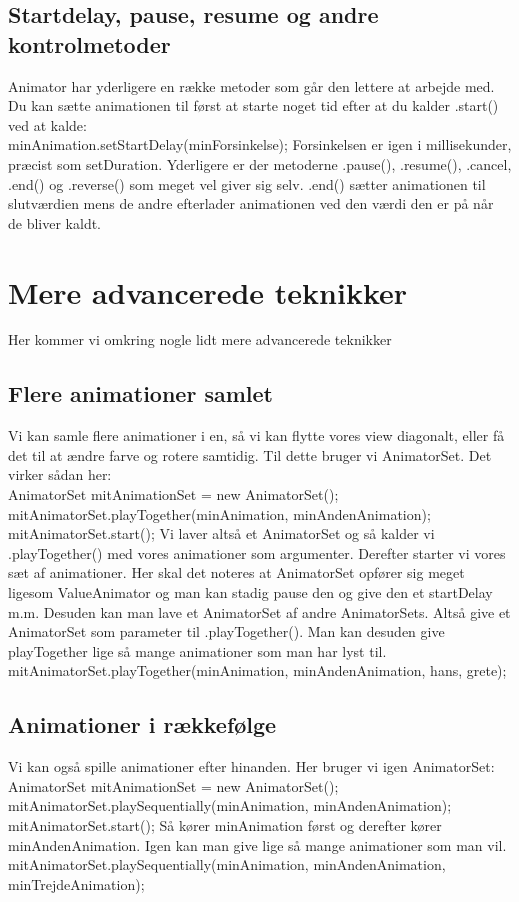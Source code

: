 \subsection{Startdelay, pause, resume og andre kontrolmetoder}
Animator har yderligere en række metoder som går den lettere at arbejde med. Du kan sætte animationen til først at starte noget tid efter at du kalder .start() ved at kalde: \\
minAnimation.setStartDelay(minForsinkelse);
Forsinkelsen er igen i millisekunder, præcist som setDuration. 
Yderligere er der metoderne .pause(), .resume(), .cancel,  .end() og .reverse() som meget vel giver sig selv. .end() sætter animationen til slutværdien mens de andre efterlader animationen ved den værdi den er på når de bliver kaldt.
\section{Mere advancerede teknikker}
Her kommer vi omkring nogle lidt mere advancerede teknikker
\subsection{Flere animationer samlet}
Vi kan samle flere animationer i en, så vi kan flytte vores view diagonalt, eller få det til at ændre farve og rotere samtidig. Til dette bruger vi AnimatorSet. Det virker sådan her:\\
	AnimatorSet mitAnimationSet = new AnimatorSet();
	mitAnimatorSet.playTogether(minAnimation, minAndenAnimation);
	mitAnimatorSet.start();
Vi laver altså et AnimatorSet og så kalder vi .playTogether() med vores animationer som argumenter. Derefter starter vi vores sæt af animationer. Her skal det noteres at AnimatorSet opfører sig meget ligesom ValueAnimator og man kan stadig pause den og give den et startDelay m.m. 
Desuden kan man lave et AnimatorSet af andre AnimatorSets. Altså give et AnimatorSet som parameter til .playTogether(). Man kan desuden give playTogether lige så mange animationer som man har lyst til.\\
	mitAnimatorSet.playTogether(minAnimation, minAndenAnimation, hans, grete);

\subsection{Animationer i rækkefølge}
Vi kan også spille animationer efter hinanden. Her bruger vi igen AnimatorSet:
	AnimatorSet mitAnimationSet = new AnimatorSet();
	mitAnimatorSet.playSequentially(minAnimation, minAndenAnimation);
	mitAnimatorSet.start();
Så kører minAnimation først og derefter kører minAndenAnimation. Igen kan man give lige så mange animationer som man vil. 
	mitAnimatorSet.playSequentially(minAnimation, minAndenAnimation, minTrejdeAnimation);
